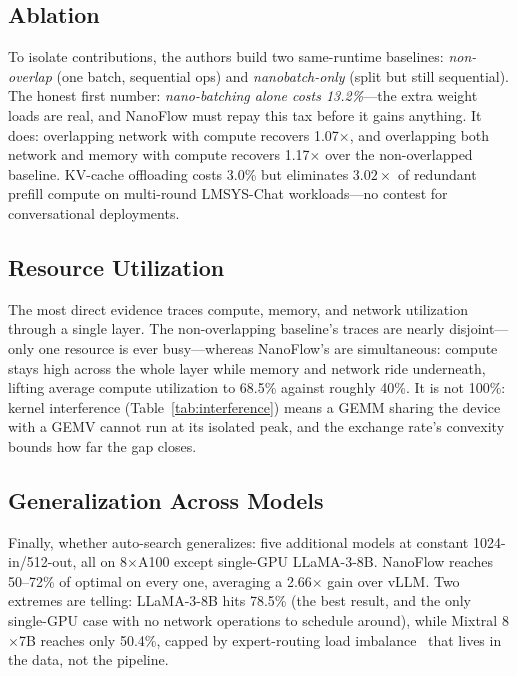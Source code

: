 \documentclass[manuscript,review]{acmart}
\newcommand{\nf}{NanoFlow\xspace}   %
\begin{document}
\subsection{Ablation}

To isolate contributions, the authors build two same-runtime baselines: \emph{non-overlap} 
(one batch, sequential ops) and \emph{nanobatch-only} (split but still sequential). The honest first number: 
\emph{nano-batching alone costs 13.2\%}---the extra weight loads are real, and \nf must repay this tax before 
it gains anything. It does: overlapping network with compute recovers 1.07$\times$, and overlapping both network 
and memory with compute recovers 1.17$\times$ over the non-overlapped baseline. KV-cache offloading costs 
3.0\% but eliminates $3.02\times$ of redundant prefill compute on multi-round LMSYS-Chat workloads---no contest 
for conversational deployments.

\subsection{Resource Utilization}

The most direct evidence traces compute, memory, and network utilization through a single layer. The 
non-overlapping baseline's traces are nearly disjoint---only one resource is ever busy---whereas \nf's are 
simultaneous: compute stays high across the whole layer while memory and network ride underneath, lifting 
average compute utilization to 68.5\% against roughly 40\%. It is not 100\%: kernel interference 
(Table~\ref{tab:interference}) means a GEMM sharing the device with a GEMV cannot run at its isolated peak, 
and the exchange rate's convexity bounds how far the gap closes.

\subsection{Generalization Across Models}

Finally, whether auto-search generalizes: five additional models at constant 1024-in/512-out, all on 
8$\times$A100 except single-GPU LLaMA-3-8B. \nf reaches 50--72\% of optimal on every one, averaging a 
2.66$\times$ gain over vLLM. Two extremes are telling: LLaMA-3-8B hits 78.5\% (the best result, and the 
only single-GPU case with no network operations to schedule around), while Mixtral 8$\times$7B reaches only 
50.4\%, capped by expert-routing load imbalance~\cite{jiang2023mistral} that lives in the data, not the pipeline.
\end{document}
